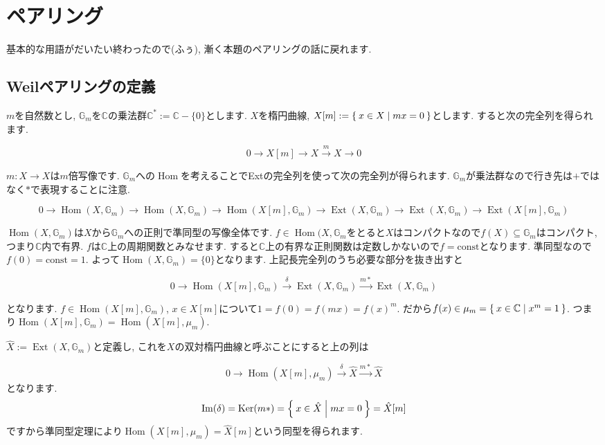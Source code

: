 \documentclass{jsarticle}
\newcommand{\CC}{\mathbb{C}}
\newcommand{\GG}{\mathbb{G}}
\newcommand{\makeop}[1]{\mathop{\mathrm{#1}}\nolimits}
\def\Im{\makeop{Im}}
\def\Ker{\makeop{Ker}}
\def\Hom{\makeop{Hom}}
\def\Ext{\makeop{Ext}}
\theoremstyle{definition}
\numberwithin{theorem}{section}
\begin{document}
\section{ペアリング}
基本的な用語がだいたい終わったので(ふぅ), 漸く本題のペアリングの話に戻れます.

\subsection{Weilペアリングの定義}

$m$を自然数とし, $\GG_m$を$\CC$の乗法群$\CC^* := \CC - \{0\}$とします. $X$を楕円曲線, $X[m] := \Set{x \in X | mx = 0}$とします. すると次の完全列を得られます. 

\begin{equation*}
0 \rightarrow X[m] \rightarrow X \xrightarrow{m} X \rightarrow 0
\end{equation*}

$m : X \rightarrow X$は$m$倍写像です. $\GG_m$への$\Hom$を考えることでExtの完全列を使って次の完全列が得られます. 
$\GG_m$が乗法群なので行き先は$+$ではなく$*$で表現することに注意. 

\begin{equation*}
0 \rightarrow \Hom(X, \GG_m) \rightarrow \Hom(X, \GG_m) \rightarrow \Hom(X[m], \GG_m) \rightarrow \Ext(X, \GG_m) \rightarrow \Ext(X, \GG_m) \rightarrow \Ext(X[m], \GG_m)
\end{equation*}

$\Hom(X, \GG_m)$は$X$から$\GG_m$への正則で準同型の写像全体です. $f\in\Hom(X, \GG_m$をとると$X$はコンパクトなので$f(X) \subseteq\GG_m$はコンパクト, つまり$\CC$内で有界. $f$は$\CC$上の周期関数とみなせます. すると$\CC$上の有界な正則関数は定数しかないので$f = \mathrm{const}$となります. 準同型なので$f(0) = \mathrm{const} = 1$. よって$\Hom(X, \GG_m) = \{0\}$となります. 上記長完全列のうち必要な部分を抜き出すと

\begin{equation*}
0 \rightarrow \Hom(X[m], \GG_m) \xrightarrow{\delta} \Ext(X, \GG_m) \xrightarrow{m*} \Ext(X, \GG_m)
\end{equation*}

となります. $f \in \Hom(X[m], \GG_m)$, $x \in X[m]$について$1 = f(0) = f(mx) = f(x)^m$. だから$f(x) \in \mu_m = \Set{x \in \CC | x^m = 1}$. つまり$\Hom(X[m], \GG_m) = \Hom(X[m], \mu_m)$.

$\hat{X} := \Ext(X, \GG_m)$と定義し, これを$X$の双対楕円曲線と呼ぶことにすると上の列は

\begin{equation*}
0 \rightarrow \Hom(X[m], \mu_m) \xrightarrow{\delta} \hat{X} \xrightarrow{m*} \hat{X}
\end{equation*}
となります.
\[
\Im(\delta) = \Ker(m*) = \Set{x \in \hat{X} | mx = 0} = \hat{X}[m]
\]
ですから準同型定理により$\Hom(X[m], \mu_m) = \hat{X}[m]$という同型を得られます.
\end{document}
